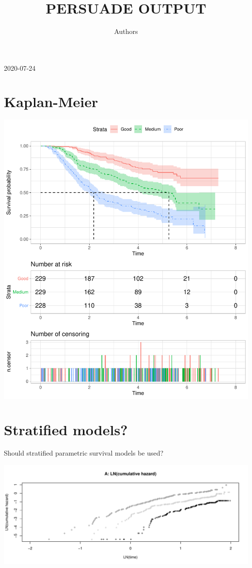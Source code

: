 \documentclass[]{article}
\title{PERSUADE OUTPUT}
\author{Authors}
\date{}
\begin{document}
\maketitle

{
\setcounter{tocdepth}{2}
\tableofcontents
}
2020-07-24

\section{Kaplan-Meier}\label{kaplan-meier}

\begin{flushleft}\includegraphics{images/plot_KM-1} \end{flushleft}

\newpage

\section{Stratified models?}\label{stratified-models}

Should stratified parametric survival models be used?

\begin{flushleft}\includegraphics[height=0.29\textheight]{images/PH_assumption-1} \end{flushleft}
\end{document}
